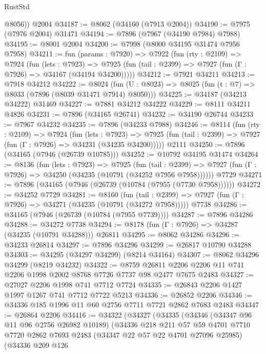 \begin{lexlean}{RustStd}
\begin{coremodule}
        @8056))
    @2004
@34187 := @8062 (@34160 (@7913 @2004))
@34190 := @7975 (@7976 @2004) @31471
@34194 := @7896 (@7967 (@34190 @7984) @7988)
@34195 := @8001 @2004
@34200 := @7998 (@8000 @34195 @31474 @7956 @7958)
@34211 := fun (params : @7920) =>
  @7922
    (fun (rty : @2109) =>
    @7924
      (fun (lets : @7923) =>
      @7925 (fun (tail : @2399) => @7927 (fun (Γ : @7926) => @34167 (@34194 @34200)))))
@34212 := @7921 @34211
@34213 := @7918 @34212
@34222 := @8024
    (fun (U : @8023) => @8025 (fun (t : @7) => @8033 (@7896 (@8039 @31471 @7914) @8050)))
@34225 := @34187 (@34213 @34222) @31469
@34227 := @7881 @34212 @34222
@34229 := @8111 @34211 @4826
@34231 := @7896 (@34165 @26741)
@34232 := @34190 @26744
@34233 := @7967 @34232
@34235 := @7896 (@34233 @7988)
@34246 := @8114
    (fun (rty : @2109) =>
    @7924
      (fun (lets : @7923) =>
      @7925 (fun (tail : @2399) => @7927 (fun (Γ : @7926) => @34231 (@34235 @34200)))))
    @2111
@34250 := @7896 (@34165 (@7946 (@26739 @10785)))
@34252 := @10792 @34195 @31474
@34264 := @8136
    (fun (lets : @7923) =>
    @7925
      (fun (tail : @2399) =>
      @7927 (fun (Γ : @7926) => @34250 (@34235 (@10791 (@34252 @7956 @7958))))))
    @7729
@34271 := @7896 (@34165 (@7946 (@26739 (@10784 (@7955 (@7730 @7958))))))
@34272 := @34252 @7729
@34281 := @8160
    (fun (tail : @2399) => @7927 (fun (Γ : @7926) => @34271 (@34235 (@10791 (@34272 @7958)))))
    @7738
@34286 := @34165 (@7946 (@26739 (@10784 (@7955 @7739))))
@34287 := @7896 @34286
@34288 := @34272 @7738
@34294 := @8178 (fun (Γ : @7926) => @34287 (@34235 (@10791 @34288))) @26811
@34295 := @8062 @34286
@34296 := @34233 @26814
@34297 := @7896 @34296
@34299 := @26817 @10790 @34288
@34303 := @34295 (@34297 @34299) (@8214 @34164)
@34307 := @8062 @34296 @34299 (@8219 @34232)
@34322 := @8759
    @26811
    @2206
    @2206
    @11
    @741
    @2206
    @1998
    @2002
    @8768
    @7726
    @7737
    @98
    @2477
    @7675
    @2483
@34327 := @27027 @2206 @1998 @741 @7712 @7724
@34335 := @26843 @2206 @1427 @1997 @1267 @741 @7712 @7722 @5213
@34336 := @26852 @2206
@34346 := @34336 @185 @1996 @11 @60 @2756 @7711 @7721 @2862 @7683 @2483
@34347 := @26864 @2206
@34416 := @34322
    (@34327
      (@34335
        (@34346
          (@34347 @96 @11 @96 @2756 @26982 @10189)
          (@34336
            @218
            @211
            @57
            @59
            @4701
            @7710
            @7720
            @2862
            @7693
            @2483
            (@34347 @22 @57 @22 @4701 @27096 @25985)
            (@34336
              @209
              @126

\end{coremodule}
\end{lexlean}
